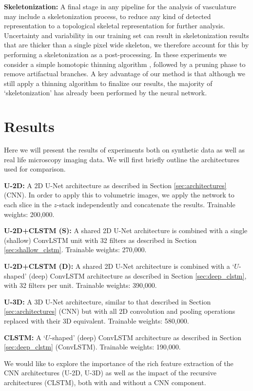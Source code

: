 \documentclass[journal,transmag]{IEEEtran}
\begin{document}
\textbf{Skeletonization: } A final stage in any pipeline for the analysis of vasculature may include a skeletonization process, to reduce any kind of detected representation to a topological skeletal representation for further analysis. Uncertainty and variability in our training set can result in skeletonization results that are thicker than a single pixel wide skeleton, we therefore account for this by performing a skeletonization as a post-processing. In these experiments we consider a simple homotopic thinning algorithm \cite{Pudney1998}, followed by a pruning phase to remove artifactual branches. A key advantage of our method is that although we still apply a thinning algorithm to finalize our results, the majority of `skeletonization' has already been performed by the neural network. 

\section{Results}

Here we will present the results of experiments both on synthetic data as well as real life microscopy imaging data. We will first briefly outline the architectures used for comparison. 

\textbf{U-2D: } A 2D U-Net architecture as described in Section \ref{sec:architectures} (CNN). In order to apply this to volumetric images, we apply the network to each slice in the $z$-stack independently and concatenate the results. Trainable weights: 200,000. 

\textbf{U-2D+CLSTM (S): } A shared 2D U-Net architecture is combined with a single (shallow) ConvLSTM unit with 32 filters as described in Section \ref{sec:shallow_clstm}. Trainable weights: 270,000.

\textbf{U-2D+CLSTM (D): } A shared 2D U-Net architecture is combined with a `$U$-shaped' (deep) ConvLSTM architecture as described in Section \ref{sec:deep_clstm}, with 32 filters per unit. Trainable weights: 390,000.

\textbf{U-3D: } A 3D U-Net architecture, similar to that described in Section \ref{sec:architectures} (CNN) but with all 2D convolution and pooling operations replaced with their 3D equivalent. Trainable weights: 580,000.

\textbf{CLSTM: } A `$U$-shaped' (deep) ConvLSTM architecture as described in Section \ref{sec:deep_clstm} (ConvLSTM). Trainable weights: 190,000.

We would like to explore the importance of the rich feature extraction of the CNN architectures (U-2D, U-3D) as well as the impact of the recursive architectures (CLSTM), both with and without a CNN component.
\end{document}
